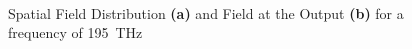  
\begin{figure}%
\centering
	\\%
\caption{Spatial Field Distribution \textbf{(a)} and Field at the Output \textbf{(b)} for a frequency of 195~THz}%
\label{fig:13_54}%
\end{figure}

